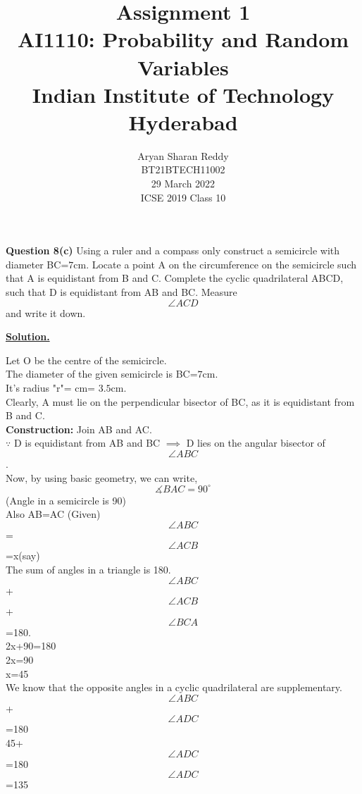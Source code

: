 \documentclass[journal,12pt,twocolumn]{IEEEtran}
\title{Assignment 1 \\ \Large AI1110: Probability and Random Variables \\ \large Indian Institute of Technology Hyderabad}
\author{Aryan Sharan Reddy \\ \normalsize BT21BTECH11002 \\ \vspace*{20pt} \normalsize  29 March 2022 \\ \vspace*{20pt} \Large ICSE 2019 Class 10}
\begin{document}
	\maketitle
	
	\textbf{Question 8(c)} 
	 Using a ruler and a compass only construct a semicircle with diameter BC=$7$cm. Locate a point A on the circumference on the semicircle such that A is equidistant from B and C. Complete the cyclic quadrilateral ABCD, such that D is equidistant from AB and BC. Measure $$\angle{ACD}$$and write it down.
	
	\textbf{\underline{Solution.}}
	
	    Let O be the centre of the semicircle.\\
		The diameter of the given semicircle is BC=$7$cm.\\ 
	    It's radius "r"= cm= $3.5$cm.\\
	    
	    Clearly, A must lie on the perpendicular bisector of BC, as it is equidistant from B and C.\\
	    \textbf{Construction:} Join AB and AC.\\
	    $\because$ D is equidistant from AB and BC $\implies$ D lies on the angular bisector of$$\angle{ABC}$$. \\
	    Now, by using basic geometry, we can write,\\
	   $$ \measuredangle{BAC}=90^{\circ} $$ (Angle in a semicircle is 90{\degree})\\
	   
	  Also AB=AC (Given)\\
	  {\implies} $$\angle{ABC}$$=$$\angle{ACB}$$=x(say)\\
	  
	  The sum of angles in a triangle is 180{\degree}.\\
	  
	  {\implies} $$\angle{ABC}$$+$$\angle{ACB}$$+$$\angle{BCA}$$=180{\degree}.\\
	  {\implies} 2x+90{\degree}=180{\degree}\\
	  {\implies}2x=90{\degree}\\
	  {\implies}x=45{\degree}\\
	 
	  We know that the opposite angles in a cyclic quadrilateral are supplementary.\\
	  {\implies}$$\angle{ABC}$$+$$\angle{ADC}$$=180{\degree}\\
	  {\implies}45{\degree}+$$\angle{ADC}$$=180{\degree}\\
	  {\implies}$$\angle{ADC}$$=135{\degree}\\
     
\end{document}
